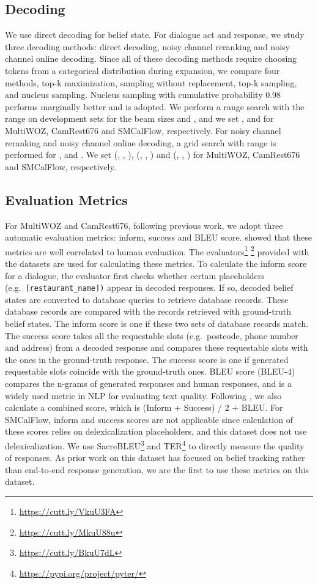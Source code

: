 \documentclass[11pt,a4paper]{article}
\begin{document}
\subsection{Decoding \label{sec:decoding_method}}
We use direct decoding for belief state. For dialogue act and response, we study three decoding methods: direct decoding, noisy channel reranking and noisy channel online decoding. Since all of these decoding methods require choosing  tokens from a categorical distribution during expansion, we compare four methods, top-k maximization, sampling without replacement, top-k sampling, and nucleus sampling. Nucleus sampling with cumulative probability 0.98 performs marginally better and is adopted. We perform a range search with the range  on development sets for the beam sizes  and , and we set ,  and  for MultiWOZ, CamRest676 and SMCalFlow, respectively. For noisy channel reranking and noisy channel online decoding, a grid search with range  is performed for ,  and . We set (, , ),  (, , ) and (, , ) for MultiWOZ, CamRest676 and SMCalFlow, respectively.

\subsection{Evaluation Metrics \label{sec:evaluation_metrics}}

For MultiWOZ and CamRest676, following previous work, we adopt three automatic evaluation metrics: inform, success and BLEU score. 
\citet{peng2020soloist} showed that these metrics are well correlated to human evaluation.
The evaluators\footnote{\url{https://cutt.ly/VkuU3FA}} \footnote{\url{https://cutt.ly/MkuU88u}} provided with the datasets are used for calculating these metrics. To calculate the inform score for a dialogue, the evaluator first checks whether certain placeholders (e.g.\ {\tt [restaurant\_name])} appear in decoded responses. If so, decoded belief states are converted to database queries to retrieve database records. These database records are compared with the records retrieved with ground-truth belief states. The inform score is one if these two sets of database records match. The success score takes all the requestable slots (e.g.\ postcode, phone number and address) from a decoded response and compares these requestable slots with the ones in the ground-truth response. The success score is one if generated requestable slots coincide with the ground-truth ones. BLEU score (BLEU-4) compares the n-grams of generated responses and human responses, and is a widely used metric in NLP for evaluating text quality. Following \citet{budzianowski2018multiwoz}, we also calculate a combined score, which is (Inform + Success) / 2 + BLEU. For SMCalFlow, inform and success scores are not applicable since calculation of these scores relies on delexicalization placeholders, and this dataset does not use delexicalization.
We use SacreBLEU\footnote{\url{https://cutt.ly/BkuU7dL}} and TER\footnote{\url{https://pypi.org/project/pyter/}} to directly measure the quality of responses. As prior work on this dataset has focused on belief tracking rather than end-to-end response generation, we are the first to use these metrics on this dataset.
\end{document}
